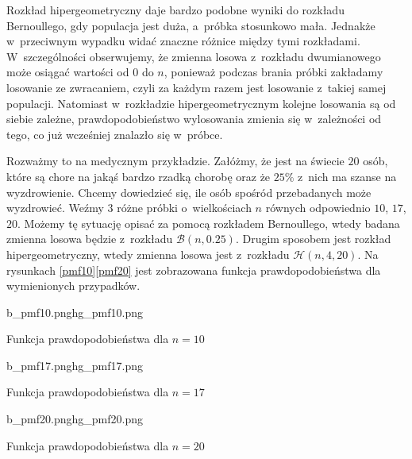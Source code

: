 Rozkład hipergeometryczny daje bardzo podobne wyniki do rozkładu Bernoullego, gdy populacja jest duża, a~próbka stosunkowo mała. Jednakże w~przeciwnym wypadku widać znaczne różnice między tymi rozkładami. W~szczególności obserwujemy, że zmienna losowa z~rozkładu dwumianowego może osiągać wartości od $0$ do $n$, ponieważ podczas brania próbki zakładamy losowanie ze zwracaniem, czyli za każdym razem jest losowanie z~takiej samej populacji. Natomiast w~rozkładzie hipergeometrycznym kolejne losowania są od siebie zależne, prawdopodobieństwo wylosowania zmienia się w~zależności od tego, co już wcześniej znalazło się w~próbce.

Rozważmy to na medycznym przykładzie. Załóżmy, że jest na świecie $20$ osób, które są chore na jakąś bardzo rzadką chorobę oraz że $25\%$ z~nich ma szanse na wyzdrowienie. Chcemy dowiedzieć się, ile osób spośród przebadanych może wyzdrowieć. Weźmy $3$ różne próbki o~wielkościach $n$ równych odpowiednio $10$, $17$, $20$. Możemy tę sytuację opisać za pomocą rozkładem Bernoullego, wtedy badana zmienna losowa będzie z~rozkładu $\mathcal{B}(n,0.25)$. Drugim sposobem jest rozkład hipergeometryczny, wtedy zmienna losowa jest z~rozkładu $\mathcal{H}(n,4,20)$. Na rysunkach \ref{pmf10}\ppauza \ref{pmf20} jest zobrazowana funkcja prawdopodobieństwa dla wymienionych przypadków.

\begin{diagrams}{b_pmf10.png}{hg_pmf10.png}
	\caption{Funkcja prawdopodobieństwa dla $n=10$}
	\label{pmf10}
\end{diagrams}

\begin{diagrams}{b_pmf17.png}{hg_pmf17.png}
	\caption{Funkcja prawdopodobieństwa dla $n=17$}
	\label{pmf17}
\end{diagrams}

\begin{diagrams}{b_pmf20.png}{hg_pmf20.png}
	\caption{Funkcja prawdopodobieństwa dla $n=20$}
	\label{pmf20}
\end{diagrams}

